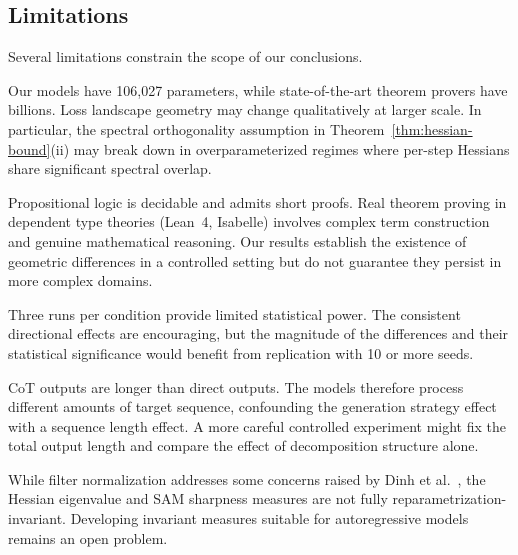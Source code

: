 \subsection{Limitations}\label{subsec:limitations}

Several limitations constrain the scope of our conclusions.

 Our models have 106{,}027 parameters, while state-of-the-art
theorem provers have billions. Loss landscape geometry may change qualitatively
at larger scale. In particular, the spectral orthogonality assumption in
Theorem~\ref{thm:hessian-bound}(ii) may break down in overparameterized
regimes where per-step Hessians share significant spectral overlap.

 Propositional logic is decidable and admits short
proofs. Real theorem proving in dependent type theories (Lean~4, Isabelle)
involves complex term construction and genuine mathematical reasoning. Our
results establish the existence of geometric differences in a controlled
setting but do not guarantee they persist in more complex domains.

 Three runs per condition provide limited statistical
power. The consistent directional effects are encouraging, but the magnitude of
the differences and their statistical significance would benefit from
replication with 10 or more seeds.

 CoT outputs are longer than direct outputs.
The models therefore process different amounts of target sequence, confounding
the generation strategy effect with a sequence length effect. A more careful
controlled experiment might fix the total output length and compare the effect
of decomposition structure alone.

 While filter normalization addresses some concerns
raised by Dinh et al.~\cite{dinh2017sharp}, the Hessian eigenvalue and SAM
sharpness measures are not fully reparametrization-invariant. Developing
invariant measures suitable for autoregressive models remains an open problem.
